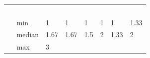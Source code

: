 \documentclass[
  english,
  man,floatsintext]{apa6}
\begin{document}
\begin{longtable}[]{@{}lllllll@{}}
\begin{minipage}[t]{0.11\columnwidth}
~~\strut
\end{minipage}\tabularnewline
\begin{minipage}[t]{0.16\columnwidth}\raggedright
~~ min\strut
\end{minipage} & \begin{minipage}[t]{0.11\columnwidth}\raggedright
1\strut
\end{minipage} & \begin{minipage}[t]{0.11\columnwidth}\raggedright
1\strut
\end{minipage} & \begin{minipage}[t]{0.11\columnwidth}\raggedright
1\strut
\end{minipage} & \begin{minipage}[t]{0.11\columnwidth}\raggedright
1\strut
\end{minipage} & \begin{minipage}[t]{0.11\columnwidth}\raggedright
1\strut
\end{minipage} & \begin{minipage}[t]{0.11\columnwidth}\raggedright
1.33\strut
\end{minipage}\tabularnewline
\begin{minipage}[t]{0.16\columnwidth}\raggedright
~~ median\strut
\end{minipage} & \begin{minipage}[t]{0.11\columnwidth}\raggedright
1.67\strut
\end{minipage} & \begin{minipage}[t]{0.11\columnwidth}\raggedright
1.67\strut
\end{minipage} & \begin{minipage}[t]{0.11\columnwidth}\raggedright
1.5\strut
\end{minipage} & \begin{minipage}[t]{0.11\columnwidth}\raggedright
2\strut
\end{minipage} & \begin{minipage}[t]{0.11\columnwidth}\raggedright
1.33\strut
\end{minipage} & \begin{minipage}[t]{0.11\columnwidth}\raggedright
2\strut
\end{minipage}\tabularnewline
\begin{minipage}[t]{0.16\columnwidth}\raggedright
~~ max\strut
\end{minipage} & \begin{minipage}[t]{0.11\columnwidth}\raggedright
3\strut
\end{minipage} & \begin{minipage}[t]{0.11\columnwidth}\raggedright

\end{minipage}
\end{longtable}
\end{document}
